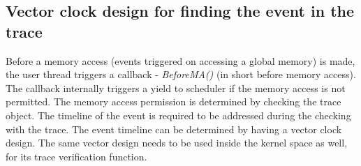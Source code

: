 \documentclass[12pt]{article}
\begin{document}
\subsection*{Vector clock design for finding the event in the trace}

Before a memory access (events triggered on accessing a global memory) is made, the user thread triggers a callback - \emph{BeforeMA()} (in short before memory access). 
The callback internally triggers a yield to scheduler if the memory access is not permitted. 
The memory access permission is determined by checking the trace object. 
The timeline of the event is required to be addressed during the checking with the trace. 
The event timeline can be determined by having a vector clock design. 
The same vector design needs to be used inside the kernel space as well, for its trace verification function.
\end{document}
